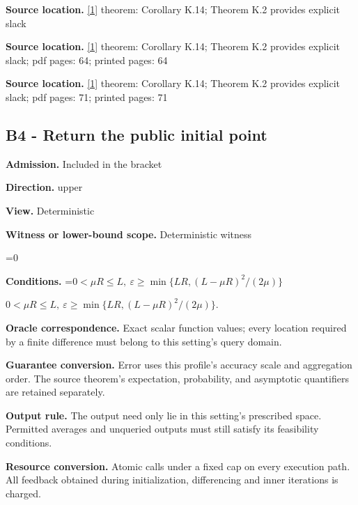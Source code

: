 \documentclass[10pt,a4paper]{article}
\newcommand{\AtlasMath}[1]{\par\begingroup\centering\setbox0=\hbox{$\displaystyle #1$}\ifdim\wd0>1.4\linewidth\typeout{ATLAS WIDE FORMULA: \the\wd0}\fi\ifdim\wd0>\linewidth\resizebox{\linewidth}{!}{\box0}\else\box0\fi\par\endgroup}
\newcommand{\AtlasInlineMath}[1]{\begingroup\setbox0=\hbox{$#1$}\ifdim\wd0>.4\linewidth\endgroup\AtlasMath{#1}\else\endgroup$#1$\fi}
\begin{document}
\textbf{Source location.} \href{https://arxiv.org/html/2610.00345v1}{[1]} theorem: Corollary K.14; Theorem K.2 provides explicit slack



\textbf{Source location.} \href{https://arxiv.org/html/2610.00345v1}{[1]} theorem: Corollary K.14; Theorem K.2 provides explicit slack; pdf pages: 64; printed pages: 64



\textbf{Source location.} \href{https://arxiv.org/html/2610.00345v1}{[1]} theorem: Corollary K.14; Theorem K.2 provides explicit slack; pdf pages: 71; printed pages: 71



\subsection{B4 - Return the public initial point}


\textbf{Admission.} Included in the bracket



\textbf{Direction.} upper



\textbf{View.} Deterministic



\textbf{Witness or lower-bound scope.} Deterministic witness



\AtlasMath{0}


\textbf{Conditions.} \AtlasInlineMath{0<\mu R\le L,\ \varepsilon\ge\min\{LR,(L-\mu R)^2/(2\mu)\}}.



\textbf{Oracle correspondence.} Exact scalar function values; every location required by a finite difference must belong to this setting's query domain.



\textbf{Guarantee conversion.} Error uses this profile's accuracy scale and aggregation order. The source theorem's expectation, probability, and asymptotic quantifiers are retained separately.



\textbf{Output rule.} The output need only lie in this setting's prescribed space. Permitted averages and unqueried outputs must still satisfy its feasibility conditions.



\textbf{Resource conversion.} Atomic calls under a fixed cap on every execution path. All feedback obtained during initialization, differencing and inner iterations is charged.
\end{document}
